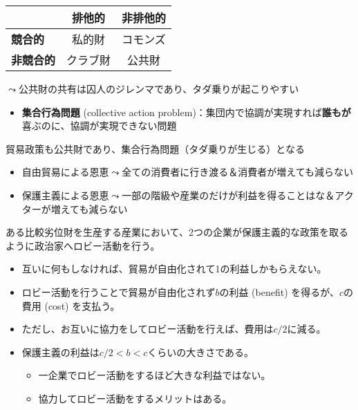 \documentclass[
  xelatex,
  ja=standard]{bxjsarticle}
\providecommand{\tightlist}{%
  \setlength{\itemsep}{0pt}\setlength{\parskip}{0pt}}\usepackage{longtable,booktabs,array}
\begin{document}
\begin{longtable}[]{@{}lcc@{}}
\toprule\noalign{}
& \textbf{排他的} & \textbf{非排他的} \\
\midrule\noalign{}
\endhead
\bottomrule\noalign{}
\endlastfoot
\textbf{競合的} & 私的財 & コモンズ \\
\textbf{非競合的} & クラブ財 & 公共財 \\
\end{longtable}

\(\leadsto\)公共財の共有は囚人のジレンマであり、タダ乗りが起こりやすい

\begin{itemize}
\tightlist
\item
  \textbf{集合行為問題} (collective action
  problem)：集団内で協調が実現すれば\textbf{誰もが}喜ぶのに、協調が実現できない問題
\end{itemize}

貿易政策も公共財であり、集合行為問題（タダ乗りが生じる）となる

\begin{itemize}
\tightlist
\item
  自由貿易による恩恵\(\leadsto\)全ての消費者に行き渡る＆消費者が増えても減らない
\item
  保護主義による恩恵\(\leadsto\)一部の階級や産業のだけが利益を得ることはな＆アクターが増えても減らない
\end{itemize}

\begin{tcolorbox}[enhanced jigsaw, toprule=.15mm, leftrule=.75mm, coltitle=black, opacityback=0, colback=white, title=\textcolor{quarto-callout-tip-color}{\faLightbulb}\hspace{0.5em}{貿易政策を巡るロビー活動}, rightrule=.15mm, bottomrule=.15mm, colbacktitle=quarto-callout-tip-color!10!white, opacitybacktitle=0.6, titlerule=0mm, colframe=quarto-callout-tip-color-frame, bottomtitle=1mm, toptitle=1mm, arc=.35mm, left=2mm, breakable]

ある比較劣位財を生産する産業において、2つの企業が保護主義的な政策を取るように政治家へロビー活動を行う。

\begin{itemize}
\tightlist
\item
  互いに何もしなければ、貿易が自由化されて1の利益しかもらえない。
\item
  ロビー活動を行うことで貿易が自由化されず\(b\)の利益 (benefit)
  を得るが、\(c\)の費用 (cost) を支払う。
\item
  ただし、お互いに協力をしてロビー活動を行えば、費用は\(c/2\)に減る。
\item
  保護主義の利益は\(c/2 < b < c\)くらいの大きさである。

  \begin{itemize}
  \tightlist
  \item
    一企業でロビー活動をするほど大きな利益ではない。
  \item
    協力してロビー活動をするメリットはある。
  \end{itemize}
\end{itemize}

\end{tcolorbox}
\end{document}
